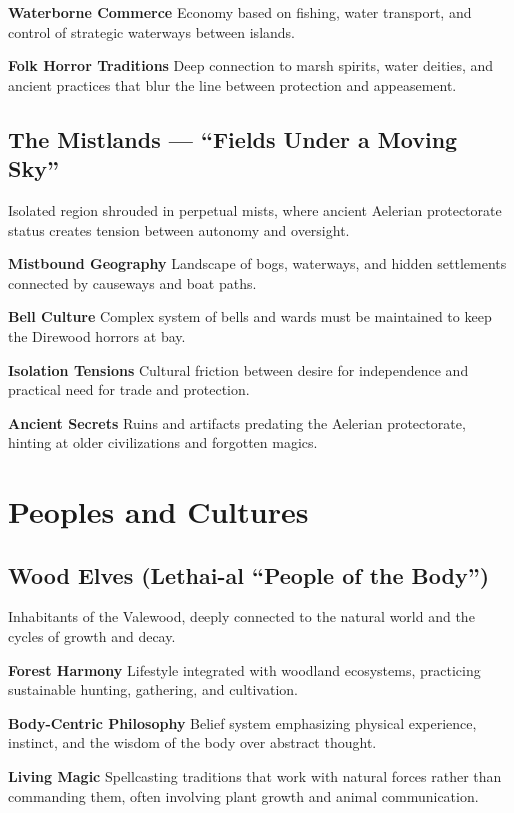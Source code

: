 \documentclass[11pt,twoside,openany]{book}
\begin{document}
\textbf{Waterborne Commerce} Economy based on fishing, water transport, and control of strategic waterways between islands.

\textbf{Folk Horror Traditions} Deep connection to marsh spirits, water deities, and ancient practices that blur the line between protection and appeasement.

\subsection*{The Mistlands --- ``Fields Under a Moving Sky''}

Isolated region shrouded in perpetual mists, where ancient Aelerian protectorate status creates tension between autonomy and oversight.

\textbf{Mistbound Geography} Landscape of bogs, waterways, and hidden settlements connected by causeways and boat paths.

\textbf{Bell Culture} Complex system of bells and wards must be maintained to keep the Direwood horrors at bay.

\textbf{Isolation Tensions} Cultural friction between desire for independence and practical need for trade and protection.

\textbf{Ancient Secrets} Ruins and artifacts predating the Aelerian protectorate, hinting at older civilizations and forgotten magics.

\section*{Peoples and Cultures} 

\subsection*{Wood Elves (Lethai-al ``People of the Body'')}

Inhabitants of the Valewood, deeply connected to the natural world and the cycles of growth and decay.

\textbf{Forest Harmony} Lifestyle integrated with woodland ecosystems, practicing sustainable hunting, gathering, and cultivation.

\textbf{Body-Centric Philosophy} Belief system emphasizing physical experience, instinct, and the wisdom of the body over abstract thought.

\textbf{Living Magic} Spellcasting traditions that work with natural forces rather than commanding them, often involving plant growth and animal communication.
\end{document}
